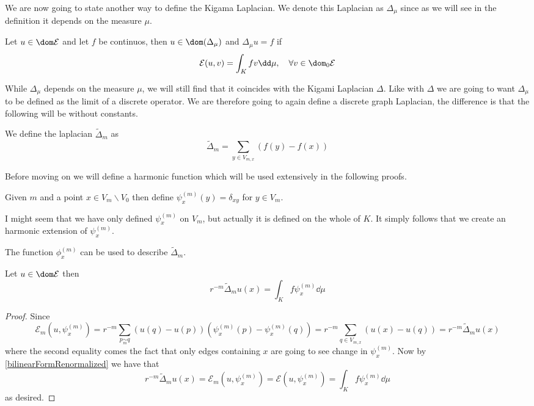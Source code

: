 We are now going to state another way to define the Kigama Laplacian. We denote this Laplacian as $\Delta_{\mu}$ since as we will see in the definition it depends on the measure $\mu$.
\begin{defi}
	Let $u \in \dom \mathcal{E}$ and let $f$ be continuos, then $u \in \dom(\Delta_{\mu})$ and $\Delta_{\mu}u =f$ if
	\begin{equation}
		\mathcal{E}(u,v) = \int_{K}fv \dd \mu, \quad \forall v \in \dom_{0}\mathcal{E}
	\end{equation}
\end{defi}

While $\Delta_{\mu}$ depends on the measure $\mu$, we will still find that it coincides with the Kigami Laplacian $\Delta$. Like with $\Delta$ we are going to want $\Delta_{\mu}$ to be defined as the limit of a discrete operator. We are therefore going to again define a discrete graph Laplacian, the difference is that the following will be without constants.

\begin{defi}\label{discreteLaplaceNoConst}
	We define the laplacian $\widetilde{\Delta}_{m}$ as
	\begin{equation}
		\widetilde{\Delta}_{m} = \sum_{y \in V_{m,x}} (f(y) -f(x))
	\end{equation}
\end{defi}

Before moving on we will define a harmonic function which will be used extensively in the following proofs.
\begin{defi}
	Given $m$ and a point $x \in V_m \backslash V_0$ then define $\psi_x^{(m)}(y) = \delta_{xy}$ for $y \in V_m$.
\end{defi}
I might seem that we have only defined $\psi_x^{(m)}$ on $V_m$, but actually it is defined on the whole of $K$. It simply follows that we create an harmonic extension of $\psi_x^{(m)}$.

The function $\phi_x^{(m)}$ can be used to describe $\widetilde{\Delta}_{m}$.
\begin{prop}\label{pointwiseEqualityofpsi}
	Let $u \in \dom \mathcal{E}$ then
	\begin{equation}
		r^{-m}\widetilde{\Delta}_{m}u(x) = \int_{K}f \psi_{x}^{(m)} \dd \mu
	\end{equation}
\end{prop}
\begin{proof}
	Since 
	\begin{equation}
		\mathcal{E}_{m}(u, \psi_{x}^{(m)}) = r^{-m} \sum_{p \underset{m}{\sim} q}(u(q)-u(p))(\psi_{x}^{(m)}(p) -\psi_{x}^{(m)}(q)) = r^{-m}\sum_{q \in V_{m,x}}(u(x)-u(q)) = r^{-m}\widetilde{\Delta}_{m}u(x)
	\end{equation}
	where the second equality comes the fact that only edges containing $x$ are going to see change in $\psi_{x}^{(m)}$. Now by \eqref{bilinearFormRenormalized} we have that
	\begin{equation}
		r^{-m}\widetilde{\Delta}_{m}u(x) = \mathcal{E}_{m}(u, \psi_{x}^{(m)}) = \mathcal{E}(u, \psi_{x}^{(m)}) = \int_{K}f \psi_{x}^{(m)} \dd \mu
	\end{equation}
	as desired.
\end{proof}

